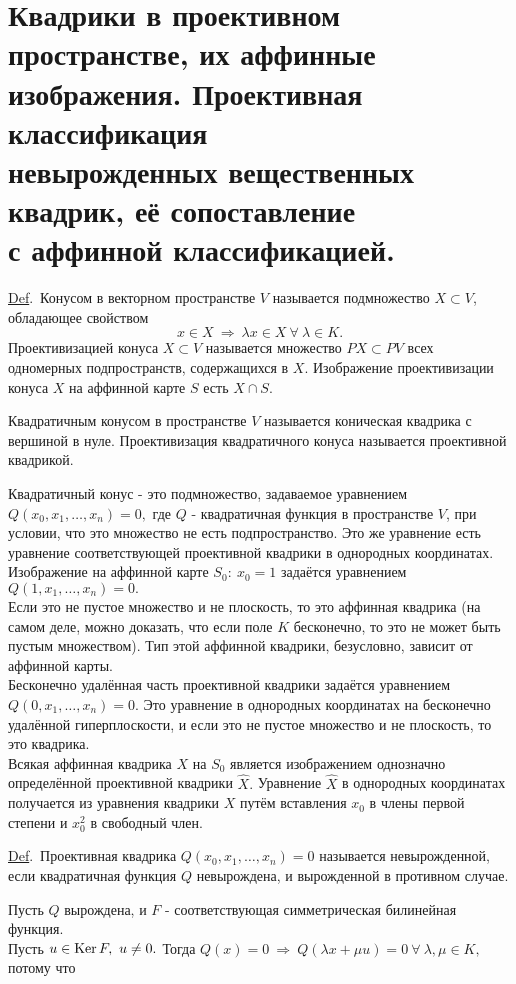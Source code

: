\documentclass[a4paper]{article}%
\renewcommand{\de}{\par\noindent\underline{Def}.\ }%
\renewcommand{\ab}{\par\noindent}%
\newcommand{\rom}[1]{{\rm#1\,}}
\newcommand{\we}[1]{\widehat{#1}}
\begin{document}
\section{Квадрики в проективном пространстве, их аффинные\\ изображения. Проективная классификация\\ невырожденных вещественных квадрик,
её сопоставление\\ с аффинной классификацией.}
\label{q55}
\de Конусом в векторном пространстве $V$ называется подмножество $X\subset V$, обладающее свойством
$$
x\in X\ \Rightarrow\ \lambda x\in X\ \forall\ \lambda\in K.
$$
Проективизацией конуса $X\subset V$ называется множество $PX\subset PV$ всех одномерных подпространств, содержащихся в $X$.
Изображение проективизации конуса $X$ на аффинной карте $S$ есть $X\cap S$.
\ab Квадратичным конусом в пространстве $V$ называется коническая квадрика с вершиной в нуле. Проективизация квадратичного
конуса называется проективной квадрикой.\ab
Квадратичный конус - это подмножество, задаваемое уравнением $Q(x_0,x_1,\dots,x_n)=0,$ где $Q$ - квадратичная функция
в пространстве $V$, при условии, что это множество не есть подпространство.
Это же уравнение есть уравнение соответствующей проективной квадрики в однородных координатах. Изображение
на аффинной карте $S_0:\ x_0=1$ задаётся уравнением\ \ $Q(1,x_1,\dots,x_n)=0.$
\\Если это не пустое множество и не плоскость, то это аффинная квадрика (на самом деле, можно доказать,
что если поле $K$ бесконечно, то это не может быть пустым множеством). Тип этой аффинной квадрики, безусловно, зависит от аффинной карты.
\\ Бесконечно удалённая часть проективной квадрики задаётся уравнением\ \ $Q(0,x_1,\dots,x_n)=0.$ Это уравнение в
однородных координатах на бесконечно удалённой гиперплоскости, и если это не пустое множество и не плоскость, то это квадрика.
\\ Всякая аффинная квадрика $X$ на $S_0$ является изображением однозначно определённой проективной квадрики $\we{X}.$
Уравнение $\we X$ в однородных координатах получается из уравнения квадрики $X$ путём вставления $x_0$ в члены первой
степени и $x_0^2$ в свободный член.
\de Проективная квадрика $Q(x_0,x_1,\dots,x_n)=0$ называется невырожденной, если квадратичная функция $Q$ невырождена,
и вырожденной в противном случае.
\ab Пусть $Q$ вырождена, и $F$ - соответствующая симметрическая билинейная функция.\\ Пусть $u\in \rom{Ker}F,\ u\ne 0.$
Тогда $Q(x)=0\ \Rightarrow\ Q(\lambda x+\mu u)=0\ \forall\ \lambda,\mu\in K,$ потому что \\
\end{document}
